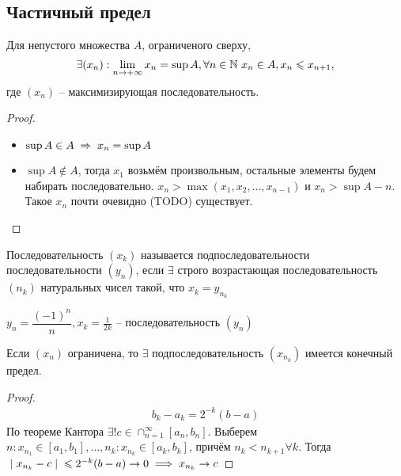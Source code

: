 \subsection{Частичный предел}
\begin{theorem}
    Для непустого множества $A$, ограниченого сверху, 
        \[ \exists (x_n) : \lim_{n\to+\infty} x_n = \sup{A}, \forall n \in \mathbb{N}\ x_n \in A, x_n \leqslant x_{n + 1}, \]
    где $(x_n)$ -- максимизирующая последовательность.
\end{theorem}
\begin{proof}\phantom\\
    \begin{itemize}
        \item $\sup{A} \in A \thus x_n = \sup{A}$
        \item $\sup{A} \notin A$, тогда $x_1$ возьмём произвольным, остальные элементы будем набирать последовательно. $x_n > \max(x_1, x_2, \ldots, x_{n - 1})$ и $x_n > \sup{A} - n$. Такое $x_n$ почти очевидно (TODO) существует.
    \end{itemize}
\end{proof}

\begin{definition}
    Последовательность $ (x_k) $ называется подпоследовательности последовательности $ (y_n) $,
    если $ \exists  $ строго возрастающая последовательность $ (n_k) $ натуральных чисел такой, что $ x_k = y_{n_k} $
\end{definition}
\begin{example}
    $ y_n = \dfrac{( - 1)^ n}{n}, x_k = \frac{1}{2k} $ -- последовательность $ (y_n) $
\end{example}

\begin{theorem}
    \label{ExistsLimitSubseq}
    Если $ (x_n) $ ограничена, то $ \exists  $ подпоследовательность $ (x_{n_k}) $ имеется конечный предел.
\end{theorem}
\begin{proof}
    \begin{gather}
        b_k - a_k = 2^{ - k}(b - a)
    \end{gather}
    По теореме Кантора $ \exists ! c \in \cap_{n = 1}^\infty [a_n, b_n] $. Выберем $ n: x_{n_1}  \in [a_1, b_1], \dots , n_k : x_{n_k} \in [a_k, b_k]$, причём $ n_k < n_{k + 1} \forall k $.
    Тогда $ \;\vert\; x_{n_k} - c \;\vert\; \leqslant  2^{ - k}(b - a) \to  0 \implies  x_{n_k} \to c $
\end{proof}

